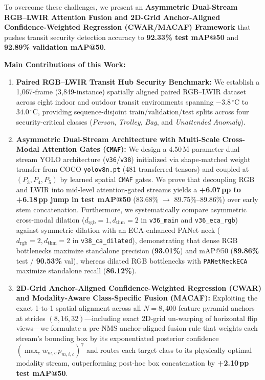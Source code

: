 \documentclass[journal,twoside,web]{ieeecolor}
\begin{document}
To overcome these challenges, we present an \textbf{Asymmetric Dual-Stream RGB--LWIR Attention Fusion and 2D-Grid Anchor-Aligned Confidence-Weighted Regression (CWAR/MACAF) Framework} that pushes transit security detection accuracy to \textbf{92.33\% test mAP@50} and \textbf{92.89\% validation mAP@50}.

\textbf{Main Contributions of this Work:}
\begin{enumerate}
    \item \textbf{Paired RGB--LWIR Transit Hub Security Benchmark:} We establish a 1,067-frame (3,849-instance) spatially aligned paired RGB--LWIR dataset across eight indoor and outdoor transit environments spanning $-3.8\,^{\circ}\text{C}$ to $34.0\,^{\circ}\text{C}$, providing sequence-disjoint train/validation/test splits across four security-critical classes (\textit{Person}, \textit{Trolley}, \textit{Bag}, and \textit{Unattended Anomaly}).
    \item \textbf{Asymmetric Dual-Stream Architecture with Multi-Scale Cross-Modal Attention Gates (\texttt{CMAF}):} We design a 4.50\,M-parameter dual-stream YOLO architecture (\texttt{v36}/\texttt{v38}) initialized via shape-matched weight transfer from COCO \texttt{yolov8n.pt} (481 transferred tensors) and coupled at $(P_3, P_4, P_5)$ by learned spatial \texttt{CMAF} gates. We prove that decoupling RGB and LWIR into mid-level attention-gated streams yields a \textbf{+6.07\,pp to +6.18\,pp jump in test mAP@50} (83.68\% $\rightarrow$ 89.75\%--89.86\%) over early stem concatenation. Furthermore, we systematically compare asymmetric cross-modal dilation ($d_{\text{rgb}}=1, d_{\text{thm}}=2$ in \texttt{v36\_main} and \texttt{v36\_eca\_rgb}) against symmetric dilation with an ECA-enhanced PANet neck ($d_{\text{rgb}}=2, d_{\text{thm}}=2$ in \texttt{v38\_ca\_dilated}), demonstrating that dense RGB bottlenecks maximize standalone precision (\textbf{93.01\%}) and mAP@50 (\textbf{89.86\%} test / \textbf{90.53\%} val), whereas dilated RGB bottlenecks with \texttt{PANetNeckECA} maximize standalone recall (\textbf{86.12\%}).
    \item \textbf{2D-Grid Anchor-Aligned Confidence-Weighted Regression (CWAR) and Modality-Aware Class-Specific Fusion (MACAF):} Exploiting the exact 1-to-1 spatial alignment across all $N=8{,}400$ feature pyramid anchors at strides $(8,16,32)$---including exact 2D-grid un-warping of horizontal flip views---we formulate a pre-NMS anchor-aligned fusion rule that weights each stream's bounding box by its exponentiated posterior confidence $(\max_c w_{m,c}\,p_{m,i,c})^\gamma$ and routes each target class to its physically optimal modality stream, outperforming post-hoc box concatenation by \textbf{+2.10\,pp test mAP@50}.

\end{enumerate}
\end{document}
